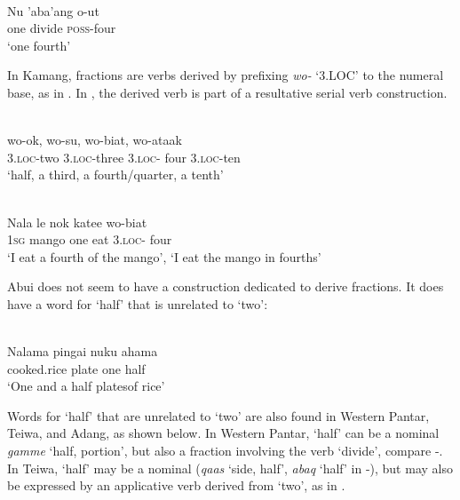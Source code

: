  

\ea
\label{ex:8:1248}
\\
\gll Nu  'aba'ang  o-ut\\
  one  divide  \textsc{poss}{}-four\\
\glt `one fourth'
\z 

  

In Kamang, fractions are verbs derived by prefixing \textit{wo-} `3.LOC' to the numeral base, as in . In , the derived verb is part of a resultative serial verb construction.


\ea%
\label{bkm:Ref342746224}
\\
\gll wo-ok,    wo-su,  wo-biat,  wo-ataak     \\  
   3.\textsc{loc-}two    3.\textsc{loc-}three  3.\textsc{loc-} four  3.\textsc{loc-}ten   \\
\glt `half, a third, a fourth/quarter, a tenth' 
\z

   

 

 


\ea%
\label{bkm:Ref342746258}
\\
\gll  Nala  le  nok  katee  wo-biat  \\  
   \textsc{1sg } mango  one  eat  3.\textsc{loc-} four    \\
\glt `I eat a fourth of the mango', `I eat the mango in fourths'
\z

     

 

Abui does not seem to have a construction dedicated to derive fractions. It does have a word for `half' that is unrelated to `two':  


\ea
\label{ex:8:1249}
\\
 \gll   Nalama  pingai  nuku  ahama   \\
    cooked.rice  plate  one  half   \\
 \glt  `One and a half platesof rice'  
\z

 
Words for `half' that are unrelated to `two' are also found in Western Pantar,  Teiwa, and Adang, as shown below.  In Western Pantar, `half' can be a nominal \textit{gamme} `half, portion', but also a fraction involving the verb `divide', compare -. In Teiwa, `half' may be a nominal (\textit{qaas} `side, half', \textit{abaq} `half' in -), but may also be expressed by an applicative verb derived from `two', as in .


